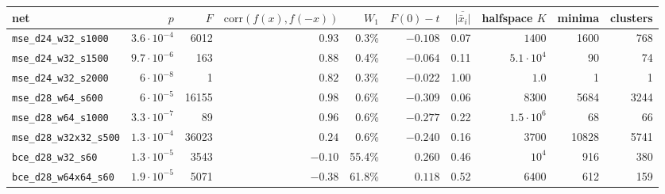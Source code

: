 \begin{tabular}{lrrrrrrrrr}
\toprule
net & $p$ & $F$ & $\mathrm{corr}(f(x),f(-x))$ & $W_1$ & $F(0)-t$ & $\overline{|\bar x_i|}$ & halfspace $K$ & minima & clusters\\
\midrule
\texttt{mse\_d24\_w32\_s1000} & $3.6\cdot10^{-4}$ & 6012 & $0.93$ & 0.3\% & $-0.108$ & 0.07 & $1400$ & 1600 & 768\\
\texttt{mse\_d24\_w32\_s1500} & $9.7\cdot10^{-6}$ & 163 & $0.88$ & 0.4\% & $-0.064$ & 0.11 & $5.1\cdot10^{4}$ & 90 & 74\\
\texttt{mse\_d24\_w32\_s2000} & $6\cdot10^{-8}$ & 1 & $0.82$ & 0.3\% & $-0.022$ & 1.00 & $1.0$ & 1 & 1\\
\texttt{mse\_d28\_w64\_s600} & $6\cdot10^{-5}$ & 16155 & $0.98$ & 0.6\% & $-0.309$ & 0.06 & $8300$ & 5684 & 3244\\
\texttt{mse\_d28\_w64\_s1000} & $3.3\cdot10^{-7}$ & 89 & $0.96$ & 0.6\% & $-0.277$ & 0.22 & $1.5\cdot10^{6}$ & 68 & 66\\
\texttt{mse\_d28\_w32x32\_s500} & $1.3\cdot10^{-4}$ & 36023 & $0.24$ & 0.6\% & $-0.240$ & 0.16 & $3700$ & 10828 & 5741\\
\texttt{bce\_d28\_w32\_s60} & $1.3\cdot10^{-5}$ & 3543 & $-0.10$ & 55.4\% & $0.260$ & 0.46 & $10^{4}$ & 916 & 380\\
\texttt{bce\_d28\_w64x64\_s60} & $1.9\cdot10^{-5}$ & 5071 & $-0.38$ & 61.8\% & $0.118$ & 0.52 & $6400$ & 612 & 159\\
\bottomrule
\end{tabular}
